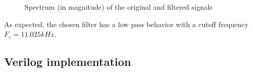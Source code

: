 \begin{figure}[!h]%
	\centering
	\qquad
	\caption{Spectrum (in magnitude) of the original and filtered signals}%
	\label{fig:filterMatlabTestbench}%
\end{figure}

As expected, the chosen filter has a low pass behavior with a cutoff frequency $F_c = 11.025 kHz$.

\subsection{Verilog implementation}

